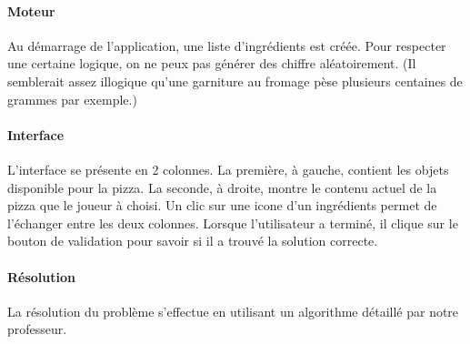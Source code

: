         \paragraph{Moteur}
            Au démarrage de l'application, une liste d'ingrédients est créée.
            Pour respecter une certaine logique, on ne peux pas générer des
            chiffre aléatoirement. (Il semblerait assez illogique qu'une
            garniture au fromage pèse plusieurs centaines de grammes par
            exemple.)
        \paragraph{Interface}
            L'interface se présente en 2 colonnes. La première, à gauche,
            contient les objets disponible pour la pizza. La seconde, à droite,
            montre le contenu actuel de la pizza que le joueur à choisi.
            Un clic sur une icone d'un ingrédients permet de l'échanger entre
            les deux colonnes.
            Lorsque l'utilisateur a terminé, il clique sur le bouton de
            validation pour savoir si il a trouvé la solution correcte.
        \paragraph{Résolution}
            La résolution du problème s'effectue en utilisant un algorithme
            détaillé par notre professeur.
